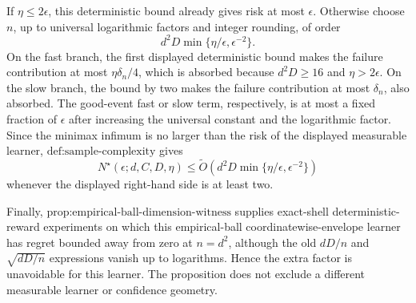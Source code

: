 If \(\eta\le2\epsilon\), this deterministic bound already gives risk at most \(\epsilon\). Otherwise choose \(n\), up to universal logarithmic factors and integer rounding, of order
\[
d^2D\min\{\eta/\epsilon,\epsilon^{-2}\}.
\]
On the fast branch, the first displayed deterministic bound makes the failure contribution at most \(\eta\delta_n/4\), which is absorbed because \(d^2D\ge16\) and \(\eta>2\epsilon\). On the slow branch, the bound by two makes the failure contribution at most \(\delta_n\), also absorbed. The good-event fast or slow term, respectively, is at most a fixed fraction of \(\epsilon\) after increasing the universal constant and the logarithmic factor. Since the minimax infimum is no larger than the risk of the displayed measurable learner, \(\text{def:sample-complexity}\) gives
\[
N^\star(\epsilon;d,C,D,\eta)
\le\widetilde O\left(d^2D\min\{\eta/\epsilon,\epsilon^{-2}\}\right)
\]
whenever the displayed right-hand side is at least two.

Finally, \(\text{prop:empirical-ball-dimension-witness}\) supplies exact-shell deterministic-reward experiments on which this empirical-ball coordinatewise-envelope learner has regret bounded away from zero at \(n=d^2\), although the old \(dD/n\) and \(\sqrt{dD/n}\) expressions vanish up to logarithms. Hence the extra factor is unavoidable for this learner. The proposition does not exclude a different measurable learner or confidence geometry.